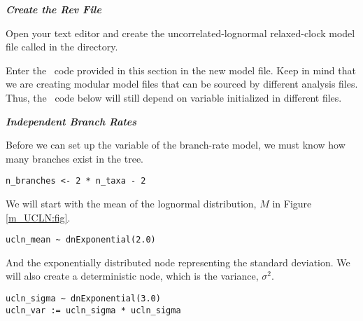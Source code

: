 \textbf{\textit{Create the Rev File}}

{\begin{framed}
Open your text editor and create the uncorrelated-lognormal relaxed-clock model file called {\textcolor{red}{}} in the  directory.

Enter the \Rev~code provided in this section in the new model file. Keep in mind that we are creating modular model files that can be sourced by different analysis files. Thus, the \Rev~code below will still depend on variable initialized in different files.
\end{framed}}




\textbf{\textit{Independent Branch Rates}}

Before we can set up the variable of the branch-rate model, we must know how many branches exist in the tree.
{\tt \begin{snugshade*}
\begin{lstlisting}
n_branches <- 2 * n_taxa - 2
\end{lstlisting}
\end{snugshade*}}

We will start with the mean of the lognormal distribution, $M$ in Figure \ref{m_UCLN:fig}.
{\tt \begin{snugshade*}
\begin{lstlisting}
ucln_mean ~ dnExponential(2.0)
\end{lstlisting}
\end{snugshade*}}

And the exponentially distributed node representing the standard deviation.
We will also create a deterministic node, which is the variance, $\sigma^2$.
{\tt \begin{snugshade*}
\begin{lstlisting}
ucln_sigma ~ dnExponential(3.0)
ucln_var := ucln_sigma * ucln_sigma
\end{lstlisting}
\end{snugshade*}}

